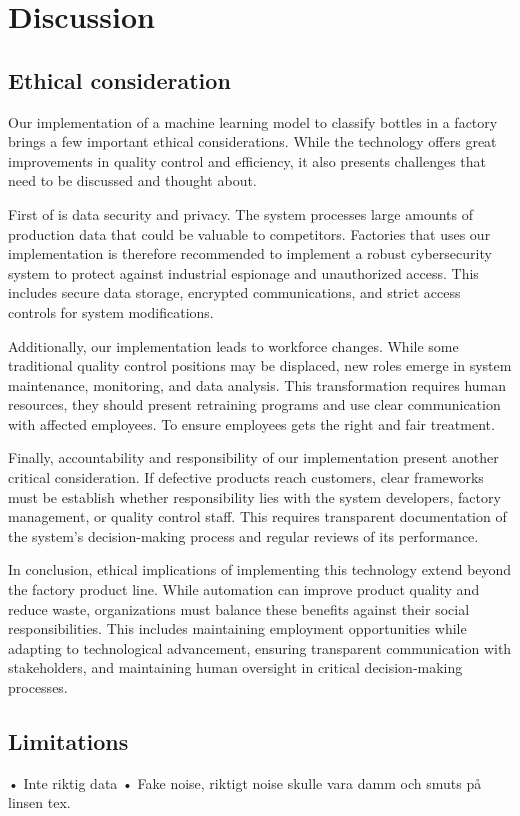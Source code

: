 \section{Discussion}

\subsection{Ethical consideration}

Our implementation of a machine learning model to classify bottles in a factory brings a few important ethical considerations. 
While the technology offers great improvements in quality control and efficiency, it also presents challenges that need to be discussed and thought about.

First of is data security and privacy. 
The system processes large amounts of production data that could be valuable to competitors. 
Factories that uses our implementation is therefore recommended to implement a robust cybersecurity system to protect against industrial espionage and unauthorized access. 
This includes secure data storage, encrypted communications, and strict access controls for system modifications.

Additionally, our implementation leads to workforce changes. While some traditional quality control positions may be displaced, new roles emerge in system maintenance, monitoring, and data analysis. 
This transformation requires human resources, they should present retraining programs and use clear communication with affected employees.
To ensure employees gets the right and fair treatment.

Finally, accountability and responsibility of our implementation present another critical consideration. 
If defective products reach customers, clear frameworks must be establish whether responsibility lies with the system developers, factory management, or quality control staff. 
This requires transparent documentation of the system's decision-making process and regular reviews of its performance.

In conclusion, ethical implications of implementing this technology extend beyond the factory product line.
While automation can improve product quality and reduce waste, organizations must balance these benefits against their social responsibilities. 
This includes maintaining employment opportunities while adapting to technological advancement, ensuring transparent communication with stakeholders, and maintaining human oversight in critical decision-making processes.

\subsection{Limitations}

• Inte riktig data
• Fake noise, riktigt noise skulle vara damm och smuts på linsen tex.